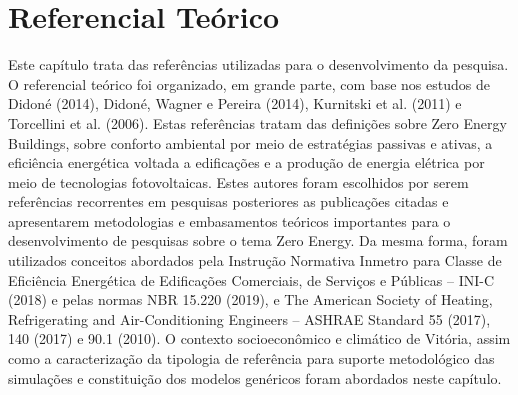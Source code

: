 \section{Referencial Teórico}
Este capítulo trata das referências utilizadas para o desenvolvimento da 
pesquisa. O referencial teórico foi organizado, em grande parte, com base 
nos estudos de Didoné (2014), Didoné, Wagner e  Pereira  (2014),  Kurnitski 
et al.  (2011)  e  Torcellini et al.  (2006).  Estas  referências  tratam  
das definições sobre Zero Energy Buildings, sobre conforto ambiental por 
meio de estratégias passivas e ativas, a eficiência energética voltada a 
edificações e a produção de energia elétrica por meio de tecnologias 
fotovoltaicas. Estes autores foram escolhidos por serem referências 
recorrentes em pesquisas posteriores as publicações citadas e apresentarem 
metodologias e embasamentos teóricos importantes para o desenvolvimento de 
pesquisas sobre o tema Zero Energy. Da mesma forma, foram utilizados 
conceitos abordados pela Instrução Normativa Inmetro para Classe de 
Eficiência Energética de Edificações Comerciais, de Serviços e Públicas 
– INI-C (2018) e pelas  normas  NBR  15.220  (2019),  e The American 
Society of Heating, Refrigerating and Air-Conditioning 
Engineers – ASHRAE Standard 55 (2017), 140 (2017) e 90.1 (2010). 
O contexto socioeconômico e climático de Vitória, assim como a caracterização 
da tipologia de referência  para  suporte  metodológico  das  simulações  
e  constituição  dos  modelos  genéricos foram abordados neste capítulo.

